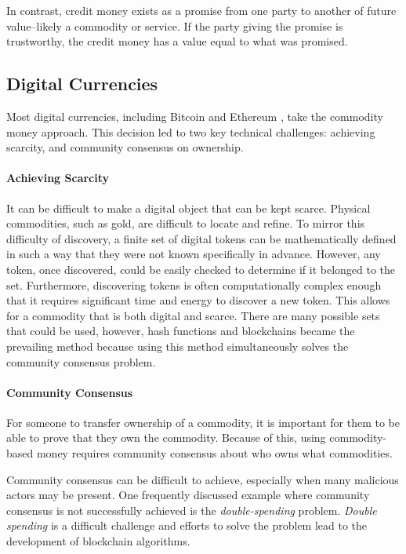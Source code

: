 \documentclass[runningheads]{llncs}
\begin{document}
In contrast, credit money exists as a promise from one party to another of future value--likely a commodity or service. If the party giving the promise is trustworthy, the credit money has a value equal to what was promised.

\subsection{Digital Currencies}
Most digital currencies, including Bitcoin and Ethereum \cite{bitcoin}, take the commodity money approach. This decision led to two key technical challenges: achieving scarcity, and community consensus on ownership.

\paragraph{Achieving Scarcity}
It can be difficult to make a digital object that can be kept scarce.
Physical commodities, such as gold, are difficult to locate and refine. To mirror this difficulty of discovery, a finite set of digital tokens can be mathematically defined in such a way that they were not known specifically in advance. However, any token, once discovered, could be easily checked to determine if it belonged to the set. Furthermore, discovering tokens is often computationally complex enough that it requires significant time and energy to discover a new token. This allows for a commodity that is both digital and scarce.
There are many possible sets that could be used, however, hash functions and blockchains became the prevailing method because using this method simultaneously solves the community consensus problem.

\paragraph{Community Consensus}
For someone to transfer ownership of a commodity, it is important for them to be able to prove that they own the commodity. Because of this, using commodity-based money requires community consensus about who owns what commodities.

Community consensus can be difficult to achieve, especially when many malicious actors may be present. One frequently discussed example where community consensus is not successfully achieved is the \emph{double-spending} problem. \emph{Double spending} is a difficult challenge and efforts to solve the problem lead to the development of blockchain algorithms. 
\end{document}
